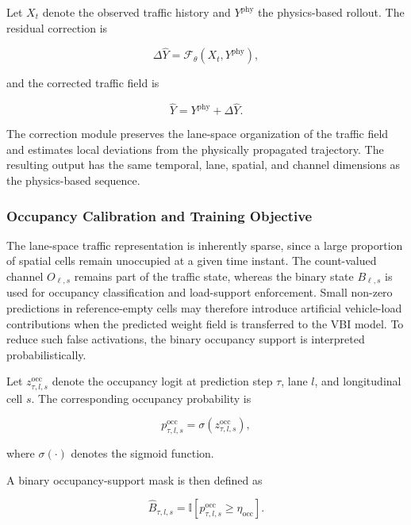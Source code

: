 \documentclass[journal]{IEEEtran}
\begin{document}
Let $X_t$ denote the observed traffic history and $Y^{\mathrm{phy}}$ the physics-based rollout. The residual correction is

\begin{equation}
\Delta\widehat{Y}
=
\mathcal{F}_{\theta}
\left(
X_t,
Y^{\mathrm{phy}}
\right),
\end{equation}

and the corrected traffic field is

\begin{equation}
\widehat{Y}
=
Y^{\mathrm{phy}}
+
\Delta\widehat{Y}.
\end{equation}

The correction module preserves the lane-space organization of the traffic field and estimates local deviations from the physically propagated trajectory. The resulting output has the same temporal, lane, spatial, and channel dimensions as the physics-based sequence.


\subsubsection{Occupancy Calibration and Training Objective}
\label{sec:occupancy_training}

The lane-space traffic representation is inherently sparse, since a large proportion of spatial cells remain unoccupied at a given time instant. The count-valued channel $O_{\ell,s}$ remains part of the traffic state, whereas the binary state $B_{\ell,s}$ is used for occupancy classification and load-support enforcement. Small non-zero predictions in reference-empty cells may therefore introduce artificial vehicle-load contributions when the predicted weight field is transferred to the VBI model. To reduce such false activations, the binary occupancy support is interpreted probabilistically.

Let $z_{\tau,l,s}^{\mathrm{occ}}$ denote the occupancy logit at prediction step $\tau$, lane $l$, and longitudinal cell $s$. The corresponding occupancy probability is

\begin{equation}
p_{\tau,l,s}^{\mathrm{occ}}
=
\sigma
\left(
z_{\tau,l,s}^{\mathrm{occ}}
\right),
\end{equation}

where $\sigma(\cdot)$ denotes the sigmoid function.

A binary occupancy-support mask is then defined as

\begin{equation}
\widehat{B}_{\tau,l,s}
=
\mathbb{I}\left[
p^{\mathrm{occ}}_{\tau,l,s}
\geq \eta_{\mathrm{occ}}
\right].
\label{eq:predicted_binary_occupancy}
\end{equation}
\end{document}
